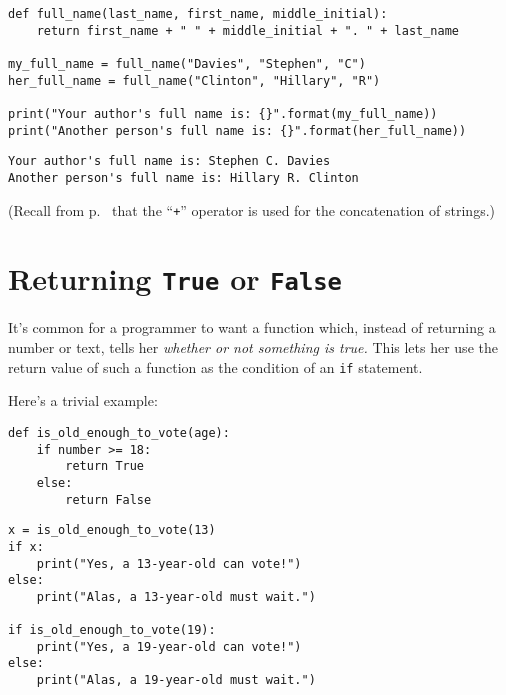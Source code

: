 \begin{Verbatim}[fontsize=\footnotesize,samepage=true,frame=single,framesep=3mm]
def full_name(last_name, first_name, middle_initial):
    return first_name + " " + middle_initial + ". " + last_name

my_full_name = full_name("Davies", "Stephen", "C")
her_full_name = full_name("Clinton", "Hillary", "R")

print("Your author's full name is: {}".format(my_full_name))
print("Another person's full name is: {}".format(her_full_name))
\end{Verbatim}
\vspace{-.2in}

\begin{Verbatim}[fontsize=\small,samepage=true,frame=leftline,framesep=5mm,framerule=1mm]
Your author's full name is: Stephen C. Davies
Another person's full name is: Hillary R. Clinton
\end{Verbatim}

\smallskip

(Recall from p.~\pageref{concatenatingStrings} that the ``\texttt{+}'' operator
is used for the concatenation of strings.)

\bigskip
\bigskip

\section{Returning \texttt{True} or \texttt{False}}

It's common for a programmer to want a function which, instead of returning a
number or text, tells her \textit{whether or not something is true.} This lets
her use the return value of such a function as the condition of an \texttt{if}
statement.

Here's a trivial example:

\begin{Verbatim}[fontsize=\small,samepage=true,frame=single,framesep=3mm]
def is_old_enough_to_vote(age):
    if number >= 18:
        return True
    else:
        return False
\end{Verbatim}

\begin{Verbatim}[fontsize=\small,samepage=true,frame=single,framesep=3mm]
x = is_old_enough_to_vote(13)
if x:
    print("Yes, a 13-year-old can vote!")
else:
    print("Alas, a 13-year-old must wait.")

if is_old_enough_to_vote(19):
    print("Yes, a 19-year-old can vote!")
else:
    print("Alas, a 19-year-old must wait.")
\end{Verbatim}
\vspace{-.4in}


